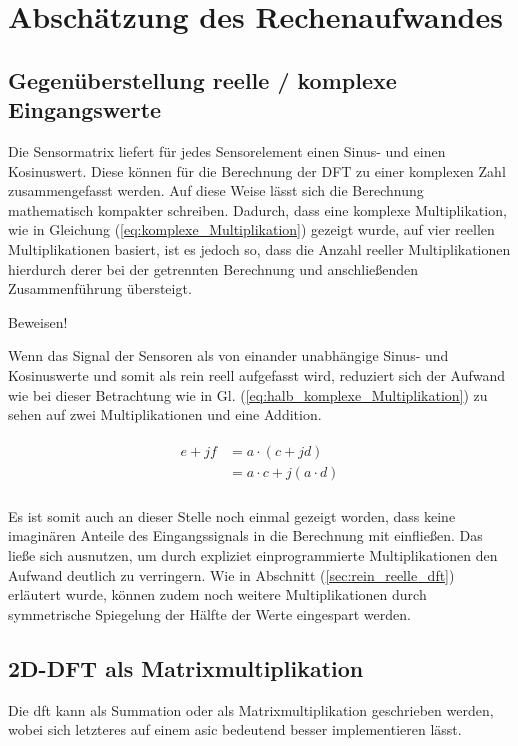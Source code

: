 \section{Abschätzung des Rechenaufwandes}\label{sec:abschaetzung_Rechenaufwand}

\subsection{Gegenüberstellung reelle / komplexe Eingangswerte}
Die Sensormatrix liefert für jedes Sensorelement einen Sinus- und einen Kosinuswert. Diese können für die Berechnung der DFT zu einer komplexen Zahl zusammengefasst werden. 
Auf diese Weise lässt sich die Berechnung mathematisch kompakter schreiben. Dadurch, dass eine komplexe Multiplikation, wie in Gleichung (\ref{eq:komplexe_Multiplikation}) 
gezeigt wurde, auf vier reellen Multiplikationen basiert,
ist es jedoch so, dass die Anzahl reeller Multiplikationen hierdurch derer bei der getrennten Berechnung und anschließenden Zusammenführung übersteigt.

Beweisen!



Wenn das Signal der Sensoren als von einander unabhängige Sinus- und Kosinuswerte  und somit als rein reell aufgefasst wird, reduziert sich der Aufwand wie 
bei dieser Betrachtung wie in Gl. (\ref{eq:halb_komplexe_Multiplikation}) zu sehen auf zwei Multiplikationen und eine Addition. 

\begin{align}\label{eq:halb_komplexe_Multiplikation}
\begin{split}
 e + jf &= a \cdot (c + jd)\\
        &= a \cdot c + j(a \cdot d)\\
\end{split}
\end{align}

Es ist somit auch an dieser Stelle noch einmal gezeigt worden, dass keine imaginären Anteile des Eingangssignals in die Berechnung mit einfließen.
Das ließe sich ausnutzen, um durch expliziet einprogrammierte Multiplikationen den Aufwand deutlich zu verringern. Wie in Abschnitt (\ref{sec:rein_reelle_dft})
erläutert wurde, können zudem noch weitere Multiplikationen durch symmetrische Spiegelung der Hälfte der Werte eingespart werden.

\subsection{2D-DFT als Matrixmultiplikation}
Die \gls{dft} kann als Summation oder als Matrixmultiplikation geschrieben werden, wobei sich letzteres auf einem \gls{asic} bedeutend besser implementieren lässt. 
 

